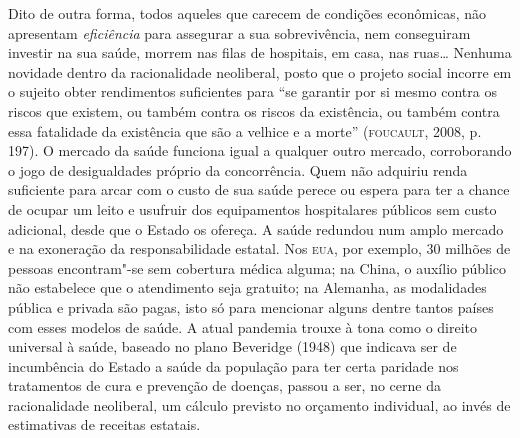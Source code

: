 Dito de outra forma, todos aqueles
que carecem de condições econômicas, não apresentam \emph{eficiência}
para assegurar a sua sobrevivência, nem conseguiram investir na sua
saúde, morrem nas filas de hospitais, em casa, nas ruas\ldots{} Nenhuma
novidade dentro da racionalidade neoliberal, posto que o projeto social
incorre em o sujeito obter rendimentos suficientes para
``se garantir por si mesmo contra
os riscos que existem, ou também contra os riscos da existência, ou
também contra essa fatalidade da existência que são a velhice e a
morte'' (\textsc{foucault}, 2008, p. 197). O mercado da saúde funciona igual a
qualquer outro mercado, corroborando o jogo de desigualdades próprio da
concorrência. Quem não adquiriu renda suficiente para arcar com o custo
de sua saúde perece ou espera para ter a chance de ocupar um leito e
usufruir dos equipamentos hospitalares públicos sem custo adicional,
desde que o Estado os ofereça. A saúde redundou num amplo mercado e na
exoneração da responsabilidade estatal. Nos \textsc{eua}, por exemplo, 30 milhões
de pessoas encontram"-se sem cobertura médica alguma; na China, o auxílio
público não estabelece que o atendimento seja gratuito; na Alemanha, as
modalidades pública e privada são pagas, isto só para mencionar alguns
dentre tantos países com esses modelos de saúde. A atual pandemia trouxe
à tona como o direito universal à saúde, baseado no plano Beveridge
(1948) que indicava ser de incumbência do Estado a saúde da população
para ter certa paridade nos tratamentos de cura e prevenção de doenças,
passou a ser, no cerne da racionalidade neoliberal, um cálculo previsto
no orçamento individual, ao invés de estimativas de receitas estatais.

